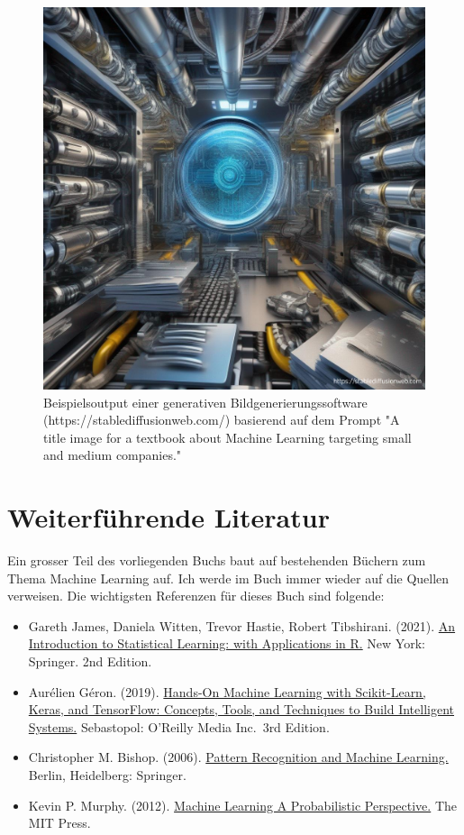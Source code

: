 \documentclass[
]{book}
\providecommand{\tightlist}{%
  \setlength{\itemsep}{0pt}\setlength{\parskip}{0pt}}
\begin{document}
\begin{figure}

{\centering \includegraphics[width=0.7\linewidth]{images/title_picture_ML} 

}

\caption{Beispielsoutput einer generativen Bildgenerierungssoftware (https://stablediffusionweb.com/) basierend auf dem Prompt "A title image for a textbook about Machine Learning targeting small and medium companies."}\label{fig:genAIExML}
\end{figure}

\hypertarget{weiterfuxfchrende-literatur}{%
\section*{Weiterführende Literatur}\label{weiterfuxfchrende-literatur}}

Ein grosser Teil des vorliegenden Buchs baut auf bestehenden Büchern zum Thema Machine Learning auf. Ich werde im Buch immer wieder auf die Quellen verweisen. Die wichtigsten Referenzen für dieses Buch sind folgende:

\begin{itemize}
\tightlist
\item
  Gareth James, Daniela Witten, Trevor Hastie, Robert Tibshirani. (2021). \href{https://www.statlearning.com/}{An Introduction to Statistical Learning: with Applications in R.} New York: Springer. 2nd Edition.
\item
  Aurélien Géron. (2019). \href{https://www.oreilly.com/library/view/hands-on-machine-learning/9781098125967/}{Hands-On Machine Learning with Scikit-Learn, Keras, and TensorFlow: Concepts, Tools, and Techniques to Build Intelligent Systems.} Sebastopol: O'Reilly Media Inc.~3rd Edition.
\item
  Christopher M. Bishop. (2006). \href{https://link.springer.com/book/9780387310732}{Pattern Recognition and Machine Learning.} Berlin, Heidelberg: Springer.
\item
  Kevin P. Murphy. (2012). \href{https://mitpress.mit.edu/9780262018029/machine-learning/}{Machine Learning A Probabilistic Perspective.} The MIT Press.
\end{itemize}
\end{document}
